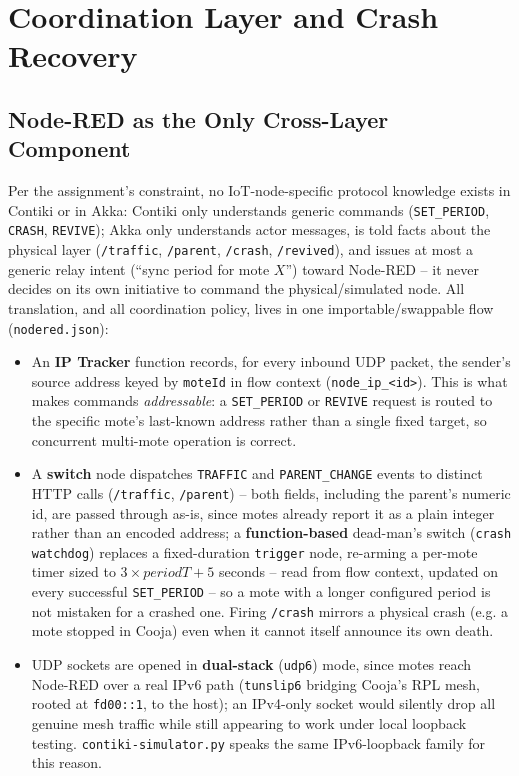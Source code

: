 \section{Coordination Layer and Crash Recovery}

\subsection*{Node-RED as the Only Cross-Layer Component}
Per the assignment's constraint, no IoT-node-specific protocol knowledge exists in Contiki
or in Akka: Contiki only understands generic commands (\texttt{SET\_PERIOD}, \texttt{CRASH},
\texttt{REVIVE}); Akka only understands actor messages, is told facts about the physical layer
(\texttt{/traffic}, \texttt{/parent}, \texttt{/crash}, \texttt{/revived}), and issues at most a
generic relay intent (``sync period for mote $X$'') toward Node-RED -- it never decides on its
own initiative to command the physical/simulated node. All translation, and all coordination
policy, lives in one importable/swappable flow (\texttt{nodered.json}):
\begin{itemize}
\item An \textbf{IP Tracker} function records, for every inbound UDP packet, the sender's
  source address keyed by \texttt{moteId} in flow context (\texttt{node\_ip\_\textless id\textgreater}).
  This is what makes commands \emph{addressable}: a \texttt{SET\_PERIOD} or \texttt{REVIVE}
  request is routed to the specific mote's last-known address rather than a single fixed
  target, so concurrent multi-mote operation is correct.
\item A \textbf{switch} node dispatches \texttt{TRAFFIC} and \texttt{PARENT\_CHANGE} events
  to distinct HTTP calls (\texttt{/traffic}, \texttt{/parent}) -- both fields, including the
  parent's numeric id, are passed through as-is, since motes already report it as a plain
  integer rather than an encoded address; a \textbf{function-based} dead-man's switch
  (\texttt{crash watchdog}) replaces a fixed-duration \texttt{trigger} node, re-arming a
  per-mote timer sized to $3 \times periodT + 5$ seconds -- read from flow context, updated on
  every successful \texttt{SET\_PERIOD} -- so a mote with a longer configured period is not
  mistaken for a crashed one. Firing \texttt{/crash} mirrors a physical crash (e.g. a mote
  stopped in Cooja) even when it cannot itself announce its own death.
\item UDP sockets are opened in \textbf{dual-stack} (\texttt{udp6}) mode, since motes reach
  Node-RED over a real IPv6 path (\texttt{tunslip6} bridging Cooja's RPL mesh, rooted at
  \texttt{fd00::1}, to the host); an IPv4-only socket would silently drop all genuine mesh
  traffic while still appearing to work under local loopback testing. \texttt{contiki-simulator.py}
  speaks the same IPv6-loopback family for this reason.
\end{itemize}

